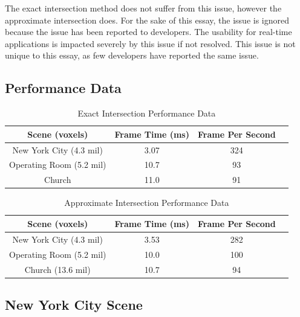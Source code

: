 \documentclass[12pt]{article}
\begin{document}
The exact intersection method does not suffer from this issue, however the approximate intersection does.
For the sake of this essay, the issue is ignored because the issue has been reported to developers.
The usability for real-time applications is impacted severely by this issue if not resolved.
This issue is not unique to this essay, as few developers have reported the same issue.


\subsection{Performance Data}

\begin{table}[H]
    \centering
    \caption{Exact Intersection Performance Data }
    \vspace{0.5cm}
    \label{tab:Exact-Performance-Data}
    \begin{tabular}{c||c|c|c|}
     Scene (voxels)             & Frame Time (ms)    & Frame Per Second \\ \toprule
    New York City (4.3 mil)     & 3.07               & 324              \\
    Operating Room (5.2 mil)    & 10.7               & 93               \\
    Church                      & 11.0               & 91               \\
    \end{tabular}
\end{table}

\begin{table}[H]
    \centering
    \caption{Approximate Intersection Performance Data }
    \vspace{0.5cm}
    \label{tab:Approx-Performance-Data}
    \begin{tabular}{c||c|c|c|}
     Scene (voxels)             & Frame Time (ms)    & Frame Per Second \\ \toprule
    New York City (4.3 mil)     & 3.53               & 282              \\
    Operating Room (5.2 mil)    & 10.0               & 100              \\
    Church (13.6 mil)           & 10.7               & 94               \\
    \end{tabular}
\end{table}


\subsection{New York City Scene}
\end{document}
